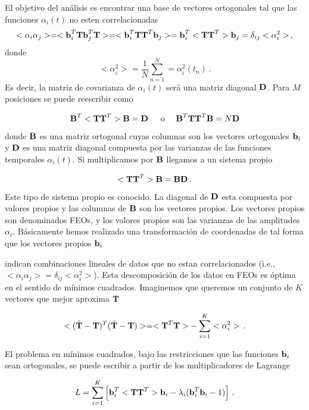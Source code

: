\documentclass[
]{agujournal2019}
\begin{document}
El objetivo del análisis es encontrar una base de vectores ortogonales
tal que las funciones \(\alpha_i(t)\) no esten correlacionadas
\[<\alpha_i \alpha_j>=<{\textbf b}^T_{i}{\textbf T}{\textbf b}^T_{j}{\textbf T}>=<{\textbf b}^T_{i}{\textbf T}{\textbf T}^T{\textbf b}_{j}>={\textbf b}^T_{i}<{\textbf T} {\textbf T}^T>{\textbf b}_{j}=\delta_{ij}<\alpha^2_i>\,,\]
donde \[<\alpha_i^2>=\frac{1}{N}\sum\limits^N_{n=1}=\alpha^2_i(t_n)\,.\]
Es decir, la matriz de covarianza de \(\alpha_i(t)\) será una matriz
diagonal \({\textbf D}\). Para \(M\) posiciones se puede reescribir como

\[{\textbf B}^T<{\textbf T}{\textbf T}^T>{\textbf B}={\textbf D}\,\,\,\,\,\,\,\,\,{\rm o}\,\,\,\,\,\,\,\,{\textbf B}^T{\textbf T}{\textbf T}^T{\textbf B}=N{\textbf D}\]

donde \({\textbf B}\) es una matriz ortogonal cuyas columnas son los
vectores ortogonales \({\textbf b}_i\) y \({\textbf D}\) es una matriz
diagonal compuesta por las varianzas de las funciones temporales
\(\alpha_i(t)\). Si multiplicamos por \({\textbf B}\) llegamos a un
sistema propio

\[<{\textbf T}{\textbf T}^T>{\textbf B}={\textbf B}{\textbf D}\,.\]

Este tipo de sistema propio es conocido. La diagonal de \({\textbf D}\)
esta compuesta por valores propios y las columnas de \({\textbf B}\) son
los vectores propios. Los vectores propios son denominados FEOs, y los
valores propios son las varianzas de las amplitudes \(\alpha_i\).
Básicamente hemos realizado una transformación de coordenadas de tal
forma que los vectores propios \({\textbf b}_i\)

indican combinaciones lineales de datos que no estan correlacionados
(i.e., \(<\alpha_i \alpha_j>=\delta_{ij}<\alpha^2_i>\)). Esta
descomposición de los datos en FEOs es óptima en el sentido de mínimos
cuadrados. Imaginemos que queremos un conjunto de \(K\) vectores que
mejor aproxima \({\textbf T}\)

\[<(\hat{\textbf T}-{\textbf T})^T(\hat{\textbf T}-{\textbf T})>=<{\textbf T}^T{\textbf T}>
  -\sum\limits^K_{i=1}<\alpha^2_i>\,.\]

El problema en mínimos cuadrados, bajo las restricciones que las
funciones \({\textbf b}_i\) sean ortogonales, se puede escribir a partir
de los multiplicadores de Lagrange

\[{\textbf \cal L}=\sum\limits^K_{i=1}\left[{\textbf b}^T_i<{\textbf T}{\textbf T}^T>{\textbf b}_i-
            \lambda_i({\textbf b}_i^T{\textbf b}_i-1)\right]\,.\]
\end{document}

